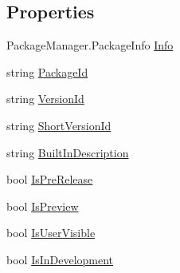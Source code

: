\subsection*{Properties}
\begin{DoxyCompactItemize}
\item 
Package\+Manager.\+Package\+Info \mbox{\hyperlink{class_unity_editor_1_1_package_manager_1_1_u_i_1_1_package_info_aa88ba8325f6ae75382a765c044aa8670}{Info}}
\item 
string \mbox{\hyperlink{class_unity_editor_1_1_package_manager_1_1_u_i_1_1_package_info_aa3c77ff26735bd5d9af2da563eddd4c5}{Package\+Id}}
\item 
string \mbox{\hyperlink{class_unity_editor_1_1_package_manager_1_1_u_i_1_1_package_info_a38b2a5d09fa5b462e10f9cc8b470ee41}{Version\+Id}}
\item 
string \mbox{\hyperlink{class_unity_editor_1_1_package_manager_1_1_u_i_1_1_package_info_a0cc2109adf081df692b25bf74f42b5c0}{Short\+Version\+Id}}
\item 
string \mbox{\hyperlink{class_unity_editor_1_1_package_manager_1_1_u_i_1_1_package_info_a32e3d98091a6bf73f0e7d02740520fbe}{Built\+In\+Description}}
\item 
bool \mbox{\hyperlink{class_unity_editor_1_1_package_manager_1_1_u_i_1_1_package_info_a3e367f94eceac5d748470f980e7c72ce}{Is\+Pre\+Release}}
\item 
bool \mbox{\hyperlink{class_unity_editor_1_1_package_manager_1_1_u_i_1_1_package_info_af630a06ace1934e60d02db5287992efe}{Is\+Preview}}
\item 
bool \mbox{\hyperlink{class_unity_editor_1_1_package_manager_1_1_u_i_1_1_package_info_a3b28eb1a18cd9b1c29df0c1f19aa7f01}{Is\+User\+Visible}}
\item 
bool \mbox{\hyperlink{class_unity_editor_1_1_package_manager_1_1_u_i_1_1_package_info_a7a4802150f8db3d5cb6d2cc3b19fc8ca}{Is\+In\+Development}}

\end{DoxyCompactItemize}
